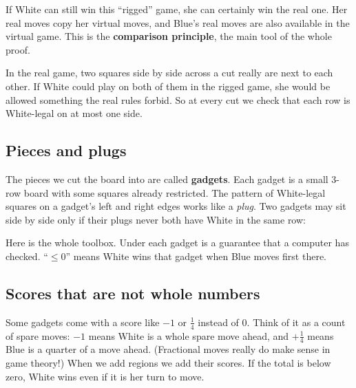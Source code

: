 \documentclass[11pt]{article}
\begin{document}
\begin{center}
\end{center}

If White can still win this ``rigged'' game, she can certainly win the real
one. Her real moves copy her virtual moves, and Blue's real moves are also
available in the virtual game. This is the \textbf{comparison principle}, the
main tool of the whole proof.

\begin{careful}
In the real game, two squares side by side across a cut really are next to
each other. If White could play on both of them in the rigged game, she would
be allowed something the real rules forbid. So at every cut we check that
each row is White-legal on at most one side.
\end{careful}

\subsection{Pieces and plugs}

The pieces we cut the board into are called \textbf{gadgets}. Each gadget is a
small $3$-row board with some squares already restricted. The pattern of
White-legal squares on a gadget's left and right edges works like a
\emph{plug}. Two gadgets may sit side by side only if their plugs never both
have White in the same row:

\begin{center}
\end{center}

Here is the whole toolbox. Under each gadget is a guarantee that a computer
has checked. ``$\le 0$'' means White wins that gadget when Blue moves first
there.

\begin{center}
\end{center}

\subsection{Scores that are not whole numbers}

Some gadgets come with a score like $-1$ or $\tfrac14$ instead of $0$. Think of
it as a count of spare moves: $-1$ means White is a whole spare move ahead, and
$+\frac14$ means Blue is a quarter of a move ahead. (Fractional moves really do
make sense in game theory!) When we add regions we add their scores. If the
total is below zero, White wins even if it is her turn to move.
\end{document}

